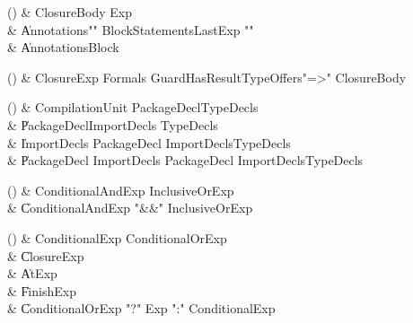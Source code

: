 \begin{bbgrammarappendix}

() & ClosureBody \label{prod:ClosureBody}  \: Exp  \\

 &    \| Annotations\opt \xcd"{" BlockStatements\opt LastExp \xcd"}" \\
 &    \| Annotations\opt Block \\

\end{bbgrammarappendix}

\begin{bbgrammarappendix}

() & ClosureExp \label{prod:ClosureExp}  \: Formals Guard\opt HasResultType\opt Offers\opt \xcd"=>" ClosureBody  \\


\end{bbgrammarappendix}

\begin{bbgrammarappendix}

() & CompilationUnit \label{prod:CompilationUnit}  \: PackageDecl\opt TypeDecls\opt  \\

 &    \| PackageDecl\opt ImportDecls TypeDecls\opt \\
 &    \| ImportDecls PackageDecl  ImportDecls\opt  TypeDecls\opt \\
 &    \| PackageDecl ImportDecls PackageDecl  ImportDecls\opt  TypeDecls\opt \\

\end{bbgrammarappendix}

\begin{bbgrammarappendix}

() & ConditionalAndExp \label{prod:ConditionalAndExp}  \: InclusiveOrExp  \\

 &    \| ConditionalAndExp \xcd"&&" InclusiveOrExp \\

\end{bbgrammarappendix}

\begin{bbgrammarappendix}

() & ConditionalExp \label{prod:ConditionalExp}  \: ConditionalOrExp  \\

 &    \| ClosureExp \\
 &    \| AtExp \\
 &    \| FinishExp \\
 &    \| ConditionalOrExp \xcd"?" Exp \xcd":" ConditionalExp \\

\end{bbgrammarappendix}

